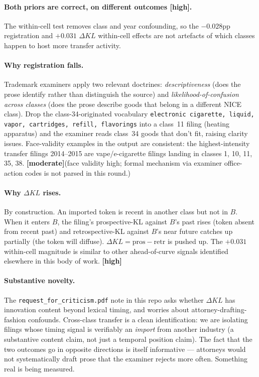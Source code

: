 \documentclass[11pt]{article}
\newcommand{\dkl}{\Delta KL}
\newcommand{\hi}{\textbf{[high]}}
\newcommand{\med}{\textbf{[moderate]}}
\begin{document}
\paragraph{Both priors are correct, on different outcomes \hi.} The
within-cell test removes class and year confounding, so the
$-0.028$pp registration and $+0.031$ $\dkl$ within-cell effects are
not artefacts of which classes happen to host more transfer
activity.

\paragraph{Why registration falls.} Trademark examiners apply two
relevant doctrines: \emph{descriptiveness} (does the prose identify
rather than distinguish the source) and
\emph{likelihood-of-confusion across classes} (does the prose
describe goods that belong in a different NICE class). Drop the
class-34-originated vocabulary \texttt{electronic cigarette, liquid,
vapor, cartridges, refill, flavorings} into a class~11 filing
(heating apparatus) and the examiner reads class~34 goods that
don't fit, raising clarity issues. Face-validity examples in the
output are consistent: the highest-intensity transfer filings
2014--2015 are vape/e-cigarette filings landing in classes 1, 10,
11, 35, 38. \med (face validity high; formal mechanism via
examiner office-action codes is not parsed in this round.)

\paragraph{Why $\dkl$ rises.} By construction. An imported token is
recent in another class but not in $B$. When it enters $B$, the
filing's prospective-KL against $B$'s past rises (token absent from
recent past) and retrospective-KL against $B$'s near future catches
up partially (the token will diffuse). $\dkl = \text{pros} -
\text{retr}$ is pushed up. The $+0.031$ within-cell magnitude is
similar to other ahead-of-curve signals identified elsewhere in this
body of work. \hi

\paragraph{Substantive novelty.} The
\texttt{request\_for\_criticism.pdf} note in this repo asks whether
$\dkl$ has innovation content beyond lexical timing, and worries
about attorney-drafting-fashion confounds. Cross-class transfer is a
clean identification: we are isolating filings whose timing signal
is verifiably an \emph{import} from another industry (a substantive
content claim, not just a temporal position claim). The fact that
the two outcomes go in opposite directions is itself informative ---
attorneys would not systematically draft prose that the examiner
rejects more often. Something real is being measured.
\end{document}
